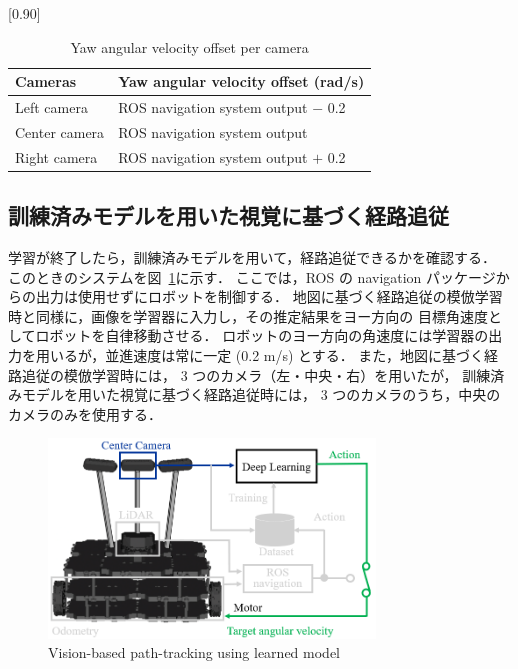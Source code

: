 \documentclass{jarticle}
\renewcommand{\figurename}{図~}
\newcommand{\figref}[1]{\figurename\ref{#1}}
\begin{document}
\vspace*{-3.5mm}

\begin{table}[h!]
  \centering
  \caption{Yaw angular velocity offset per camera}
  \label{table:1}
    \scalebox{0.90}[0.90]{
    \begin{tabular}{|l|l|}
      \hline\hline
      Cameras & Yaw angular velocity offset (rad/s)\\
      \hline\hline
      Left camera & ROS navigation system output $-$ 0.2\\
      \hline
      Center camera & ROS navigation system output\\
      \hline
      Right camera & ROS navigation system output $+$ 0.2\\
      \hline
    \end{tabular} }
\end {table}

\subsection{訓練済みモデルを用いた視覚に基づく経路追従}
学習が終了したら，訓練済みモデルを用いて，経路追従できるかを確認する．
このときのシステムを\figref{fig:4}に示す．
ここでは，ROS の navigation パッケージからの出力は使用せずにロボットを制御する．
地図に基づく経路追従の模倣学習時と同様に，画像を学習器に入力し，その推定結果をヨー方向の
目標角速度としてロボットを自律移動させる．
ロボットのヨー方向の角速度には学習器の出力を用いるが，並進速度は常に一定 (0.2 m/s) とする．
また，地図に基づく経路追従の模倣学習時には， 3 つのカメラ（左・中央・右）を用いたが，
訓練済みモデルを用いた視覚に基づく経路追従時には， 3 つのカメラのうち，中央のカメラのみを使用する．

\begin{figure}[h!]
  \centering
   \includegraphics[height=53mm]{./png/afterlearn.png}
   \caption{Vision-based path-tracking using learned model}
   \label{fig:4}
\end{figure}
\end{document}
